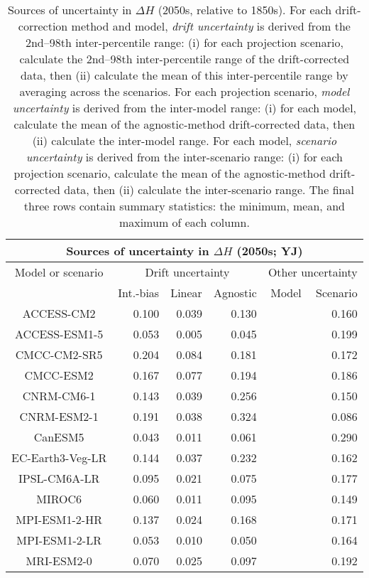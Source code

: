 \begin{table*}[t]
\centering
\caption{Sources of uncertainty in $\Delta H$ (2050s, relative to 1850s). For each drift-correction method and model, \emph{drift uncertainty} is derived from the 2nd--98th inter-percentile range: (i) for each projection scenario, calculate the 2nd--98th inter-percentile range of the drift-corrected data, then (ii) calculate the mean of this inter-percentile range by averaging across the scenarios. For each projection scenario, \emph{model uncertainty} is derived from the inter-model range: (i) for each model, calculate the mean of the agnostic-method drift-corrected data, then (ii) calculate the inter-model range. For each model, \emph{scenario uncertainty} is derived from the inter-scenario range: (i) for each projection scenario, calculate the mean of the agnostic-method drift-corrected data, then (ii) calculate the inter-scenario range. The final three rows contain summary statistics: the minimum, mean, and maximum of each column.}
\begin{tabular}{c|rrr|rr}
\toprule
\multicolumn{6}{c}{Sources of uncertainty in $\Delta H$ (2050s; YJ)} \\ 
\midrule
Model or scenario & \multicolumn{3}{c|}{Drift uncertainty} & \multicolumn{2}{c}{Other uncertainty} \\
 & Int.-bias & Linear & Agnostic & Model & Scenario \\
\midrule
ACCESS-CM2 & 0.100 & 0.039 & 0.130 &  & 0.160 \\
ACCESS-ESM1-5 & 0.053 & 0.005 & 0.045 &  & 0.199 \\
CMCC-CM2-SR5 & 0.204 & 0.084 & 0.181 &  & 0.172 \\
CMCC-ESM2 & 0.167 & 0.077 & 0.194 &  & 0.186 \\
CNRM-CM6-1 & 0.143 & 0.039 & 0.256 &  & 0.150 \\
CNRM-ESM2-1 & 0.191 & 0.038 & 0.324 &  & 0.086 \\
CanESM5 & 0.043 & 0.011 & 0.061 &  & 0.290 \\
EC-Earth3-Veg-LR & 0.144 & 0.037 & 0.232 &  & 0.162 \\
IPSL-CM6A-LR & 0.095 & 0.021 & 0.075 &  & 0.177 \\
MIROC6 & 0.060 & 0.011 & 0.095 &  & 0.149 \\
MPI-ESM1-2-HR & 0.137 & 0.024 & 0.168 &  & 0.171 \\
MPI-ESM1-2-LR & 0.053 & 0.010 & 0.050 &  & 0.164 \\
MRI-ESM2-0 & 0.070 & 0.025 & 0.097 &  & 0.192 \\

\end{tabular}
\end{table*}

